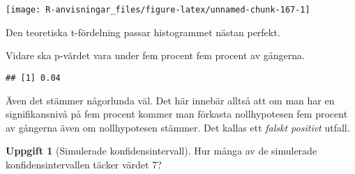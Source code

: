 \documentclass[
]{book}
\newenvironment{Shaded}{\begin{snugshade}}{\end{snugshade}}
\newcommand{\FloatTok}[1]{\textcolor[rgb]{0.00,0.00,0.81}{#1}}
\newcommand{\FunctionTok}[1]{\textcolor[rgb]{0.13,0.29,0.53}{\textbf{#1}}}
\newcommand{\NormalTok}[1]{#1}
\newcommand{\SpecialCharTok}[1]{\textcolor[rgb]{0.81,0.36,0.00}{\textbf{#1}}}
\theoremstyle{definition}
\theoremstyle{definition}
\theoremstyle{definition}
\newtheorem{exercise}{Uppgift}[chapter]
\theoremstyle{definition}
\theoremstyle{remark}
\begin{document}
\begin{center}\texttt{[image: R-anvisningar\_files/figure-latex/unnamed-chunk-167-1]} \end{center}

Den teoretiska t-fördelning passar histogrammet nästan perfekt.

Vidare ska p-värdet vara under fem procent fem procent av gångerna.

\begin{Shaded}
\end{Shaded}

\begin{verbatim}
## [1] 0.04
\end{verbatim}

Även det stämmer någorlunda väl. Det här innebär alltså att om man har en signifikansnivå på fem procent kommer man förkasta nollhypotesen fem procent av gångerna även om nollhypotesen stämmer. Det kallas ett \emph{falskt positivt} utfall.

\begin{exercise}[Simulerade konfidensintervall]
Hur många av de simulerade konfidensintervallen täcker värdet 7?
\end{exercise}
\end{document}
